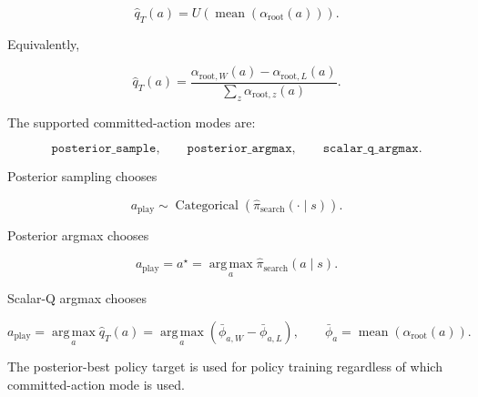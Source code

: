 \documentclass[11pt]{article}
\newcommand{\Cat}{\operatorname{Categorical}}
\newcommand{\argmax}{\operatorname*{arg\,max}}
\newcommand{\mean}{\operatorname{mean}}
\newcommand{\Utility}{U}
\begin{document}
\[
\hat{q}_T(a)
=
\Utility
\left(
\mean
\left(
\alpha_{\mathrm{root}}(a)
\right)
\right).
\]

Equivalently,

\[
\hat{q}_T(a)
=
\frac{
\alpha_{\mathrm{root},W}(a)
-
\alpha_{\mathrm{root},L}(a)
}{
\sum_z \alpha_{\mathrm{root},z}(a)
}.
\]

The supported committed-action modes are:

\[
\texttt{posterior\_sample},
\qquad
\texttt{posterior\_argmax},
\qquad
\texttt{scalar\_q\_argmax}.
\]

Posterior sampling chooses

\[
a_{\mathrm{play}}
\sim
\Cat
\left(
\hat{\pi}_{\mathrm{search}}(\cdot\mid s)
\right).
\]

Posterior argmax chooses

\[
a_{\mathrm{play}}
=
a^\star
=
\argmax_a
\hat\pi_{\mathrm{search}}(a\mid s).
\]

Scalar-Q argmax chooses

\[
a_{\mathrm{play}}
=
\argmax_a
\hat{q}_T(a)
=
\argmax_a
\left(
\bar\phi_{a,W}-\bar\phi_{a,L}
\right),
\qquad
\bar\phi_a=\mean(\alpha_{\mathrm{root}}(a)).
\]

The posterior-best policy target is used for policy training regardless of which
committed-action mode is used.
\end{document}
